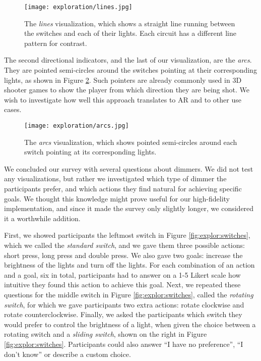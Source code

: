 \begin{figure}
    \centering
    \texttt{[image: exploration/lines.jpg]}
    \caption{The \textit{lines} visualization, which shows a straight line running between the switches and each of their lights. Each circuit has a different line pattern for contrast.}
    \label{fig:explor:lines_vis}
\end{figure}

The second directional indicators, and the last of our visualization, are the \textit{arcs}. They are pointed semi-circles around the switches pointing at their corresponding lights, as shown in Figure \ref{fig:explor:arcs_vis}. Such pointers are already commonly used in 3D shooter games to show the player from which direction they are being shot. We wish to investigate how well this approach translates to AR and to other use cases.

\begin{figure}
    \centering
    \texttt{[image: exploration/arcs.jpg]}
    \caption{The \textit{arcs} visualization, which shows pointed semi-circles around each switch pointing at its corresponding lights.}
    \label{fig:explor:arcs_vis}
\end{figure}

We concluded our survey with several questions about dimmers. We did not test any visualizations, but rather we investigated which type of dimmer the participants prefer, and which actions they find natural for achieving specific goals. We thought this knowledge might prove useful for our high-fidelity implementation, and since it made the survey only slightly longer, we considered it a worthwhile addition.

First, we showed participants the leftmost switch in Figure \ref{fig:explor:switches}, which we called the \textit{standard switch}, and we gave them three possible actions: short press, long press and double press. We also gave two goals: increase the brightness of the lights and turn off the lights. For each combination of an action and a goal, six in total, participants had to answer on a 1-5 Likert scale how intuitive they found this action to achieve this goal. Next, we repeated these questions for the middle switch in Figure \ref{fig:explor:switches}, called the \textit{rotating switch}, for which we gave participants two extra actions: rotate clockwise and rotate counterclockwise. Finally, we asked the participants which switch they would prefer to control the brightness of a light, when given the choice between a rotating switch and a \textit{sliding switch}, shown on the right in Figure \ref{fig:explor:switches}. Participants could also answer ``I have no preference'', ``I don't know'' or describe a custom choice.

